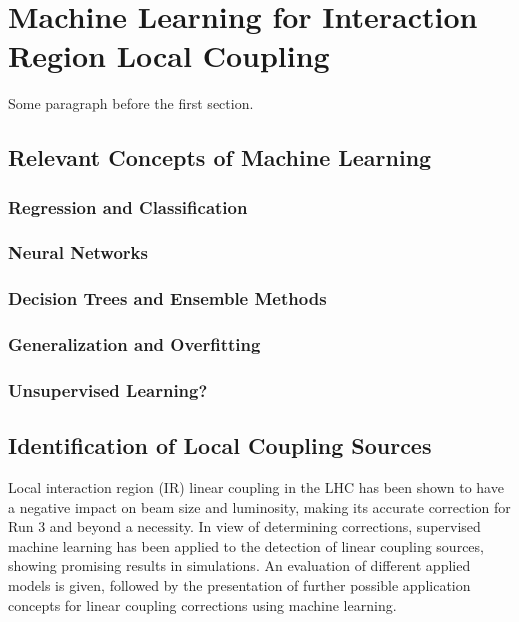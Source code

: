 \chapter{Machine Learning for Interaction Region Local Coupling} %
\label{chapter:ml_local_coupling} %


Some paragraph before the first section.


\section{Relevant Concepts of Machine Learning}

\subsection{Regression and Classification}

\subsection{Neural Networks}

\subsection{Decision Trees and Ensemble Methods}

\subsection{Generalization and Overfitting}

\subsection{Unsupervised Learning?}


\section{Identification of Local Coupling Sources}

Local interaction region (IR) linear coupling in the LHC has been shown to have a negative impact on beam size and luminosity, making its accurate correction for Run 3 and beyond a necessity.
In view of determining corrections, supervised machine learning has been applied to the detection of linear coupling sources, showing promising results in simulations.
An evaluation of different applied models is given, followed by the presentation of further possible application concepts for linear coupling corrections using machine learning.

